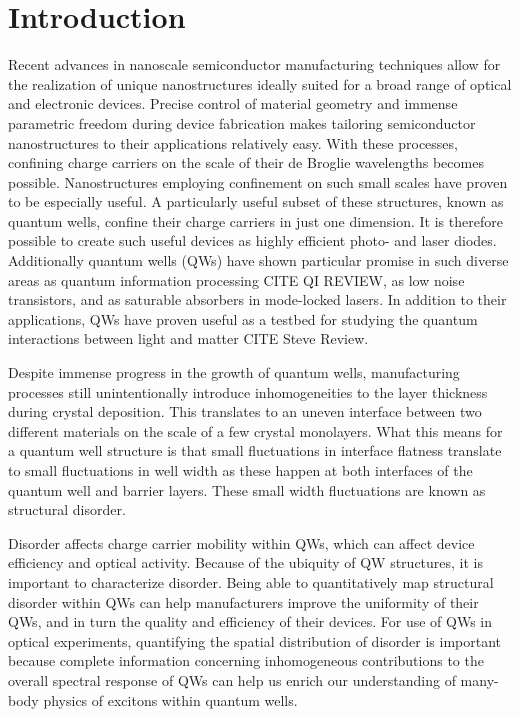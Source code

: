 \chapter{Introduction}
\indent Recent advances in nanoscale semiconductor manufacturing techniques allow for the realization of unique nanostructures ideally suited for a broad range of optical and electronic devices. Precise control of material geometry and immense parametric freedom during device fabrication makes tailoring semiconductor nanostructures to their applications relatively easy. With these processes, confining charge carriers on the scale of their de Broglie wavelengths becomes possible. Nanostructures employing confinement on such small scales have proven to be especially useful. A particularly useful subset of these structures, known as quantum wells, confine their charge carriers in just one dimension. It is therefore possible to create such useful devices as highly efficient photo- and laser diodes. Additionally quantum wells (QWs) have shown particular promise in such diverse areas as quantum information processing  CITE QI REVIEW, as low noise transistors, and as saturable absorbers in mode-locked lasers. In addition to their applications, QWs have proven useful as a testbed for studying the quantum interactions between light and matter CITE Steve Review.

\indent Despite immense progress in the growth of quantum wells, manufacturing processes still unintentionally introduce inhomogeneities to the layer thickness during crystal deposition. This translates to an uneven interface between two different materials on the scale of a few crystal monolayers. What this means for a quantum well structure is that small fluctuations in interface flatness translate to small fluctuations in well width as these happen at both interfaces of the quantum well and barrier layers. These small width fluctuations are known as structural disorder.

\indent Disorder affects charge carrier mobility within QWs, which can affect device efficiency and optical activity. Because of the ubiquity of QW structures, it is important to characterize disorder. Being able to quantitatively map structural disorder within QWs can help manufacturers improve the uniformity of their QWs, and in turn the quality and efficiency of their devices. For use of QWs in optical experiments, quantifying the spatial distribution of disorder is important because complete information concerning inhomogeneous contributions to the overall spectral response of QWs can help us enrich our understanding of many-body physics of excitons within quantum wells.

